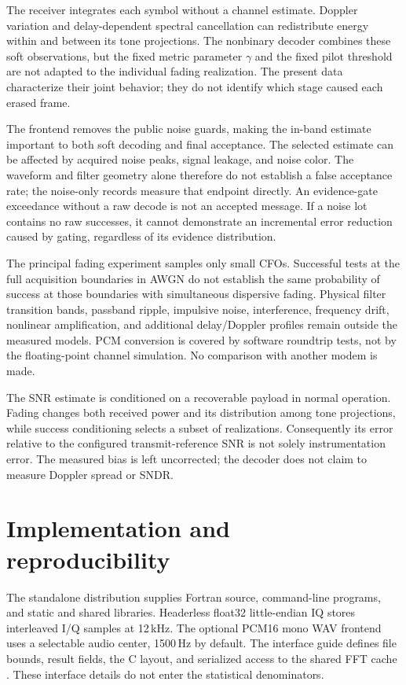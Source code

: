 \documentclass[11pt,a4paper]{article}
\begin{document}
The receiver integrates each symbol without a channel estimate. Doppler
variation and delay-dependent spectral cancellation can redistribute energy
within and between its tone projections. The nonbinary decoder combines
these soft observations, but the fixed metric parameter $\gamma$ and the
fixed pilot threshold are not adapted to the individual fading realization.
The present data characterize their joint behavior; they do not identify
which stage caused each erased frame.

The frontend removes the public noise guards, making the in-band estimate
important to both soft decoding and final acceptance. The selected estimate
can be affected by acquired noise peaks, signal leakage, and noise color.
The waveform and filter geometry alone therefore do not establish a false
acceptance rate; the noise-only records measure that endpoint directly.
An evidence-gate exceedance without a raw decode is not an accepted message.
If a noise lot contains no raw successes, it cannot demonstrate an incremental
error reduction caused by gating, regardless of its evidence distribution.

The principal fading experiment samples only small CFOs. Successful tests
at the full acquisition boundaries in AWGN do not establish the same
probability of success at those boundaries with simultaneous dispersive
fading. Physical filter transition bands, passband ripple, impulsive noise,
interference, frequency drift, nonlinear amplification, and additional
delay/Doppler profiles remain outside the measured models. PCM conversion
is covered by software roundtrip tests, not by the floating-point channel
simulation. No comparison with another modem is made.

The SNR estimate is conditioned on a recoverable payload in normal operation.
Fading changes both received power and its distribution among tone
projections, while success conditioning selects a subset of realizations.
Consequently its error relative to the configured transmit-reference SNR
is not solely instrumentation error. The measured bias is left uncorrected;
the decoder does not claim to measure Doppler spread or SNDR.

\section{Implementation and reproducibility}

The standalone distribution supplies Fortran source, command-line programs,
and static and shared libraries. Headerless float32 little-endian IQ stores
interleaved I/Q samples at 12\,kHz. The optional PCM16 mono WAV frontend
uses a selectable audio center, 1500\,Hz by default. The interface guide
defines file bounds, result fields, the C layout, and serialized access to
the shared FFT cache \cite{software}. These interface details do not enter
the statistical denominators.
\end{document}
